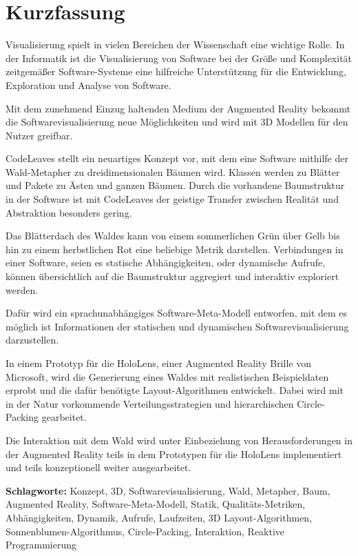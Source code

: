 \chapter*{Kurzfassung}
\thispagestyle{empty}

Visualisierung spielt in vielen Bereichen der Wissenschaft eine wichtige Rolle. In der Informatik ist die Visualisierung von Software bei der Größe und Komplexität zeitgemäßer Software-Systeme eine hilfreiche Unterstützung für die Entwicklung, Exploration und Analyse von Software.

Mit dem zunehmend Einzug haltenden Medium der Augmented Reality bekommt die Softwarevisualisierung neue Möglichkeiten und wird mit 3D Modellen für den Nutzer greifbar.

CodeLeaves stellt ein neuartiges Konzept vor, mit dem eine Software mithilfe der Wald-Metapher zu dreidimensionalen Bäumen wird. Klassen werden zu Blätter und Pakete zu Ästen und ganzen Bäumen. Durch die vorhandene Baumstruktur in der Software ist mit CodeLeaves der geistige Transfer zwischen Realität und Abstraktion besonders gering.

Das Blätterdach des Waldes kann von einem sommerlichen Grün über Gelb bis hin zu einem herbstlichen Rot eine beliebige Metrik darstellen. Verbindungen in einer Software, seien es statische Abhängigkeiten, oder dynamische Aufrufe, können übersichtlich auf die Baumstruktur aggregiert und interaktiv exploriert werden.

Dafür wird ein sprachunabhängiges Software-Meta-Modell entworfen, mit dem es möglich ist Informationen der statischen und dynamischen Softwarevisualisierung darzustellen.

In einem Prototyp für die HoloLens, einer Augmented Reality Brille von Microsoft, wird die Generierung eines Waldes mit realistischen Beispieldaten erprobt und die dafür benötigte Layout-Algorithmen entwickelt. Dabei wird mit in der Natur vorkommende Verteilungsstrategien und hierarchischen Circle-Packing gearbeitet.

Die Interaktion mit dem Wald wird unter Einbeziehung von Herausforderungen in der Augmented Reality teils in dem Prototypen für die HoloLens implementiert und teils konzeptionell weiter ausgearbeitet.

\bigskip
\noindent \textbf{Schlagworte:} Konzept, 3D, Softwarevisualisierung, Wald, Metapher, Baum, Augmented Reality, Software-Meta-Modell, Statik, Qualitäts-Metriken, Abhängigkeiten, Dynamik, Aufrufe, Laufzeiten, 3D Layout-Algorithmen, Sonnenblumen-Algorithmus, Circle-Packing, Interaktion, Reaktive Programmierung
